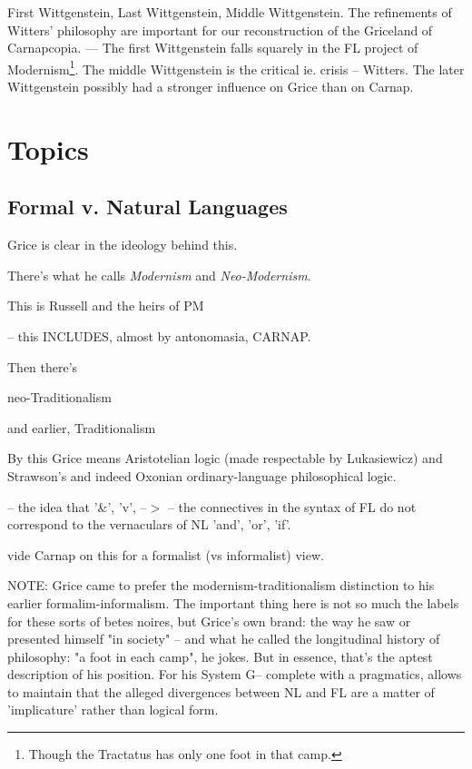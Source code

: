 \documentclass[10pt,titlepage]{book}
\begin{document}
{First Wittgenstein, Last Wittgenstein, Middle Wittgenstein. The 
refinements of  Witters' philosophy are important for our reconstruction of the Griceland of Carnapcopia.
--- The first Wittgenstein falls squarely in the FL project of Modernism\footnote{Though the Tractatus has only one foot in that camp.}.
The middle Wittgenstein is the critical ie. crisis -- Witters.
The later Wittgenstein possibly had  a stronger influence on Grice 
than on  Carnap.

\chapter{Topics}

\section{Formal v. Natural Languages}
 
Grice is clear in the ideology behind this.
 
There's what he calls {\it Modernism} and {\it Neo-Modernism}.
 
This is Russell and the heirs of PM
 
  -- this INCLUDES, almost by antonomasia, CARNAP.
 
 
Then there's
 
  neo-Traditionalism
 
  and earlier, Traditionalism
 
  By this Grice means Aristotelian logic (made respectable by  Lukasiewicz)
  and Strawson's and indeed Oxonian ordinary-language philosophical  logic.
 
  -- the idea that '\&', 'v', --$>$ -- the connectives in the  syntax of FL
  do not correspond to the vernaculars of NL 'and', 'or', 'if'.
 
  vide Carnap on this for a formalist (vs informalist) view.
  

NOTE: Grice came to prefer the modernism-traditionalism  distinction to his 
earlier formalim-informalism. The important thing here is not  so much the 
labels for these sorts of betes noires, but Grice's own brand: the  way he 
saw or presented himself "in society" -- and what he called the  longitudinal 
history of philosophy: "a foot in each camp", he jokes. But in  essence, 
that's the aptest description of his position. For his System G--  complete 
with a pragmatics, allows to maintain that the alleged divergences  between 
NL and FL are a matter of 'implicature' rather than logical form. 
 
}
\end{document}
